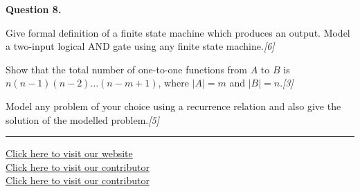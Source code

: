 \documentclass[11pt,a4paper]{article}
\newcommand{\pts}[1]{\hfill   \textit{[#1]}}
\begin{document}
\medskip


\noindent   \textbf{Question 8.}

\begin{parts}
  \item Give formal definition of a finite state machine which produces an output. Model a two-input logical AND gate using any finite state machine.\pts{6}
  \item Show that the total number of one-to-one functions from $A$ to $B$ is $n(n-1)(n-2)\dots(n-m+1)$, where $|A| = m$ and $|B| = n$.\pts{3}
  \item Model any problem of your choice using a recurrence relation and also give the solution of the modelled problem.\pts{5}
\end{parts}

\vfill
\rule{\linewidth}{0.4pt}

\begin{center}\small
\href{https://bhu-exam.vercel.app/}{Click here to visit our website}\\[4pt]\href{https://me-aryan.vercel.app/}{Click here to visit our contributor}\\[4pt]\href{https://quashan-me.vercel.app/}{Click here to visit our contributor}
\end{center}
\end{document}
